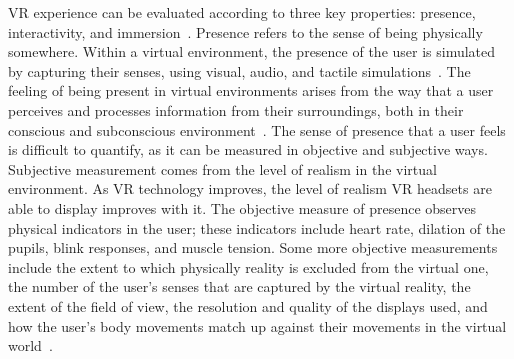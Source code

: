 VR experience can be evaluated according to three key properties: presence, interactivity, and immersion~\cite{Walsh2002}.
Presence refers to the sense of being physically somewhere.
Within a virtual environment, the presence of the user is simulated by capturing their senses, using visual, audio, and tactile simulations~\cite{Sanchez2005}.
The feeling of being present in virtual environments arises from the way that a user perceives and processes information from their surroundings, both in their conscious and subconscious environment~\cite{Barfield2000}.
The sense of presence that a user feels is difficult to quantify, as it can be measured in objective and subjective ways.
Subjective measurement comes from the level of realism in the virtual environment.
As VR technology improves, the level of realism VR headsets are able to display improves with it.
The objective measure of presence observes physical indicators in the user; these indicators include heart rate, dilation of the pupils, blink responses, and muscle tension.
Some more objective measurements include the extent to which physically reality is excluded from the virtual one, the number of the user's senses that are captured by the virtual reality, the extent of the field of view, the resolution and quality of the displays used, and how the user's body movements match up against their movements in the virtual world~\cite{Sanchez2005, Barfield2000}.
